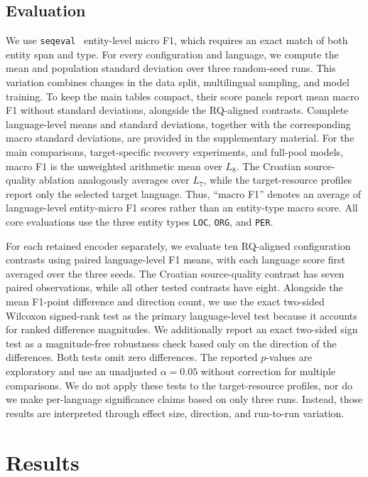 \documentclass{article}
\begin{document}
\subsection{Evaluation}
We use \texttt{seqeval}~\parencite{seqeval-2018} entity-level micro F1, which requires an exact match of both entity span and type.
For every configuration and language, we compute the mean and population standard deviation over three random-seed runs.
This variation combines changes in the data split, multilingual sampling, and model training.
To keep the main tables compact, their score panels report mean macro F1 without standard deviations, alongside the RQ-aligned contrasts.
Complete language-level means and standard deviations, together with the corresponding macro standard deviations, are provided in the supplementary material.
For the main comparisons, target-specific recovery experiments, and full-pool models, macro F1 is the unweighted arithmetic mean over $L_8$.
The Croatian source-quality ablation analogously averages over $L_7$, while the target-resource profiles report only the selected target language.
Thus, ``macro F1'' denotes an average of language-level entity-micro F1 scores rather than an entity-type macro score. All core evaluations use the three entity types \texttt{LOC}, \texttt{ORG}, and \texttt{PER}.

For each retained encoder separately, we evaluate ten RQ-aligned configuration contrasts using paired language-level F1 means, with each language score first averaged over the three seeds.
The Croatian source-quality contrast has seven paired observations, while all other tested contrasts have eight.
Alongside the mean F1-point difference and direction count, we use the exact two-sided Wilcoxon signed-rank test as the primary language-level test because it accounts for ranked difference magnitudes.
We additionally report an exact two-sided sign test as a magnitude-free robustness check based only on the direction of the differences. Both tests omit zero differences.
The reported $p$-values are exploratory and use an unadjusted $\alpha=0.05$ without correction for multiple comparisons.
We do not apply these tests to the target-resource profiles, nor do we make per-language significance claims based on only three runs.
Instead, those results are interpreted through effect size, direction, and run-to-run variation.

\section{Results}
\label{sec:results}
\end{document}
